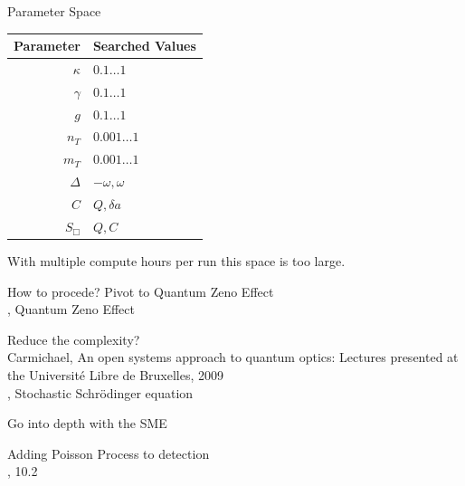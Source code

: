 \documentclass{beamer}
\begin{document}
\begin{frame}{Parameter Space}
	\begin{center}
		\begin{tabular}{ rl }
			Parameter & Searched Values\\
			\hline
			$\kappa$ & $0.1 \dots 1$\\
			$\gamma$ & $0.1 \dots 1$\\
			$g$ & $0.1 \dots 1$\\
			$n_T$ & $0.001 \dots 1$\\
			$m_T$ & $0.001 \dots 1$\\
			$\Delta$ & $-\omega, \omega$\\
			$C$ & $Q, \delta a$\\
			$S_\Box$ & $Q, C$\\
		 \end{tabular}
	\end{center}

	With multiple compute hours per run this space is too large.

\end{frame}

\begin{frame}{How to procede?}
	Pivot to Quantum Zeno Effect\\
	{\tiny\cite{kramer_quantumopticsjl_2024}, Quantum Zeno Effect}

	Reduce the complexity?\\
	{\tiny Carmichael, An open systems approach to quantum optics: Lectures presented at the Université Libre de Bruxelles, 2009\\
	\cite{kramer_quantumopticsjl_2024}, Stochastic Schrödinger equation}

	\textcolor{seegrau}{Go into depth with the SME}
	
	\textcolor{seegrau}{
		Adding Poisson Process to detection\\
		{\tiny\cite{jacobs_straightforward_2006}, 10.2}
	}
\end{frame}


{
	\begin{frame}[plain]{}\end{frame}
}
\end{document}
